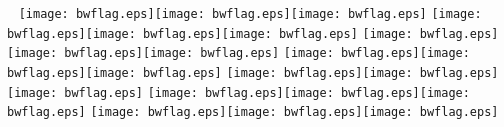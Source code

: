 \documentclass{article}
\newcommand{\flag}{\texttt{[image: bwflag.eps]}}
\newcommand{\flagrow}{\vfill\flag\hfill\flag\hfill\flag\vfill}
\begin{document}
\begin{center}
	~
	\flagrow
	\flagrow
	\flagrow
	\flagrow
	\flagrow
	\flagrow
	\flagrow
\end{center}
\end{document}
